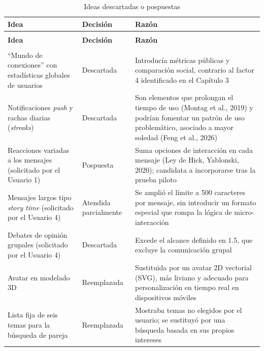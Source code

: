 \begin{longtable}{
  >{\raggedright\arraybackslash}p{}
  >{\raggedright\arraybackslash}p{}
  >{\raggedright\arraybackslash}p{}
}
\caption{Ideas descartadas o pospuestas}\label{tab:ideas_descartadas}\\
\toprule
\textbf{Idea} & \textbf{Decisión} & \textbf{Razón} \\
\midrule
\endfirsthead

\multicolumn{3}{l}{\textit{Tabla \thetable{} (continuación)}} \\[4pt]
\toprule
\textbf{Idea} & \textbf{Decisión} & \textbf{Razón} \\
\midrule
\endhead

\midrule
\multicolumn{3}{r}{\textit{Continúa en la siguiente página}} \\
\endfoot

\bottomrule
\endlastfoot

``Mundo de conexiones'' con estadísticas globales de usuarios & Descartada & Introducía métricas públicas y comparación social, contrario al factor 4 identificado en el Capítulo 3 \\[6pt]
Notificaciones \textit{push} y rachas diarias (\textit{streaks}) & Descartada & Son elementos que prolongan el tiempo de uso (Montag et al., 2019) y podrían fomentar un patrón de uso problemático, asociado a mayor soledad (Feng et al., 2026) \\[6pt]
Reacciones variadas a los mensajes (solicitado por el Usuario 1) & Pospuesta & Suma opciones de interacción en cada mensaje (Ley de Hick, Yablonski, 2020); candidata a incorporarse tras la prueba piloto \\[6pt]
Mensajes largos tipo \textit{story time} (solicitado por el Usuario 4) & Atendida parcialmente & Se amplió el límite a 500 caracteres por mensaje, sin introducir un formato especial que rompa la lógica de micro-interacción \\[6pt]
Debates de opinión grupales (solicitado por el Usuario 4) & Descartada & Excede el alcance definido en 1.5, que excluye la comunicación grupal \\[6pt]
Avatar en modelado 3D & Reemplazada & Sustituida por un avatar 2D vectorial (SVG), más liviano y adecuado para personalización en tiempo real en dispositivos móviles \\[6pt]
Lista fija de seis temas para la búsqueda de pareja & Reemplazada & Mostraba temas no elegidos por el usuario; se sustituyó por una búsqueda basada en sus propios intereses \\

\end{longtable}

